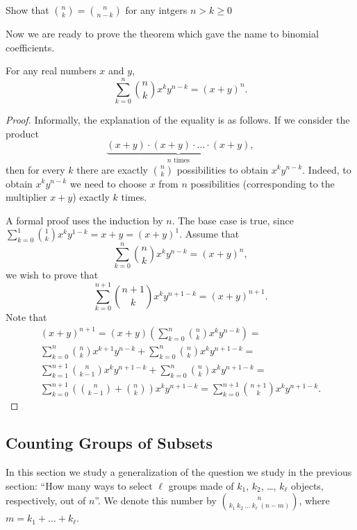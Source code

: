 \begin{exercise}
  Show that $\binom{n}{k} = \binom{n}{n - k}$ for any intgers $n > k \ge 0$
\end{exercise}


Now we are ready to prove the theorem which gave the name to binomial
coefficients.
\begin{theorem}
  For any real numbers $x$ and $y$,
    \[
      \sum_{k = 0}^n \binom{n}{k} x^k y^{n - k} = (x + y)^n.
    \]
\end{theorem}
\begin{proof}
  Informally, the explanation of the equality is as follows.
  If we consider the product
  \[
    \underbrace{(x + y) \cdot (x + y) \cdot
      \ldots \cdot (x + y)}_{n \text{ times}},
  \]
  then for every $k$ there are exactly $\binom{n}{k}$ possibilities to obtain
  $x^k y^{n - k}$. Indeed, to obtain $x^k y^{n - k}$ we need to choose $x$ from
  $n$ possibilities (corresponding to the multiplier $x + y$) exactly $k$ times.

  A formal proof uses the induction by $n$. The base case is
  true, since $\sum_{k = 0}^1 \binom{1}{k} x^k y^{1 - k} = x + y =
  (x + y)^1$. Assume that
  \[
    \sum_{k = 0}^n \binom{n}{k} x^k y^{n - k} = (x + y)^n,
  \]
  we wish to prove that
  \[
    \sum_{k = 0}^{n + 1} \binom{n + 1}{k} x^k y^{n + 1 - k} =
      (x + y)^{n + 1}.
  \]
  Note that
  \begin{multline*}
    (x + y)^{n + 1} = (x + y)
      \left(
        \sum_{k = 0}^n \binom{n}{k} x^k y^{n - k}
      \right) = \\
    \sum_{k = 0}^n \binom{n}{k} x^{k + 1} y^{n - k} +
      \sum_{k = 0}^n \binom{n}{k} x^{k} y^{n + 1 - k} = \\
    \sum_{k = 1}^{n + 1} \binom{n}{k - 1} x^k y^{n + 1 - k} +
      \sum_{k = 0}^n \binom{n}{k} x^k y^{n + 1 - k} = \\
    \sum_{k = 0}^{n + 1}
      \left(
        \binom{n}{k - 1} + \binom{n}{k}
      \right)
      x^k y^{n + 1 - k} =
    \sum_{k = 0}^{n + 1} \binom{n + 1}{k} x^k y^{n + 1 - k}.
  \end{multline*}
\end{proof}

\subsection{Counting Groups of Subsets}
In this section we study a generalization of the question we study in the
previous section: ``How many ways to select $\ell$ groups made of $k_1$, $k_2$,
\dots, $k_\ell$ objects, respectively, out of $n$''. We denote this number by
$\binom{n}{k_1 \ k_2 \ \dots \ k_\ell \  (n - m)}$, where
$m = k_1 + \dots + k_\ell$.

